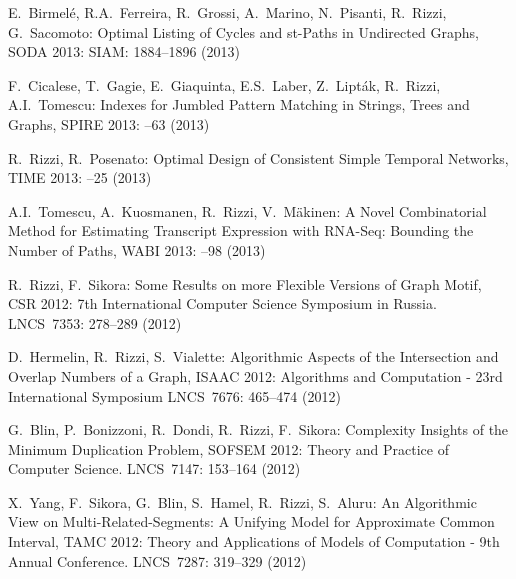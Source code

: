 \begin{etaremune}
  \item {E.~Birmel\'e, R.A.~Ferreira, R.~Grossi, A.~Marino, N.~Pisanti, R.~Rizzi, G.~Sacomoto:}
   \newblock Optimal Listing of Cycles and st-Paths in Undirected Graphs,
   \newblock SODA 2013:
   \newblock SIAM: 1884--1896 (2013)

  \item {F.~Cicalese, T.~Gagie, E.~Giaquinta, E.S.~Laber, Z.~Lipt\'ak, R.~Rizzi, A.I.~Tomescu:}
   \newblock Indexes for Jumbled Pattern Matching in Strings, Trees and Graphs,
   \newblock SPIRE 2013:
   --63 (2013)

  \item {R.~Rizzi, R.~Posenato:}
   \newblock Optimal Design of Consistent Simple Temporal Networks,
   \newblock TIME 2013:
   --25 (2013)

  \item {A.I.~Tomescu, A.~Kuosmanen, R.~Rizzi, V.~M\"akinen:}
   \newblock A Novel Combinatorial Method for Estimating Transcript Expression with RNA-Seq: Bounding the Number of Paths,
   \newblock WABI 2013:
   --98 (2013)

\vspace{-1.8mm}
  \item {R.~Rizzi, F.~Sikora:}
   \newblock Some Results on more Flexible Versions of Graph Motif,
   \newblock CSR 2012: 7th International Computer Science Symposium in Russia.
   \newblock LNCS~7353: 278--289 (2012)

\vspace{-1.8mm}
  \item {D.~Hermelin, R.~Rizzi, S.~Vialette:}
   \newblock Algorithmic Aspects of the Intersection and Overlap Numbers of a Graph,
   \newblock ISAAC 2012: Algorithms and Computation - 23rd International Symposium
   \newblock LNCS~7676: 465--474 (2012)

\vspace{-1.8mm}
  \item {G.~Blin, P.~Bonizzoni, R.~Dondi, R.~Rizzi, F.~Sikora:}
   \newblock Complexity Insights of the Minimum Duplication Problem,
   \newblock SOFSEM 2012: Theory and Practice of Computer Science.
   \newblock LNCS~7147: 153--164 (2012)

\vspace{-1.8mm}
  \item {X.~Yang, F.~Sikora, G.~Blin, S.~Hamel, R.~Rizzi, S.~Aluru:}
   \newblock An Algorithmic View on Multi-Related-Segments: A Unifying Model for Approximate Common Interval,
   \newblock TAMC 2012: Theory and Applications of Models of Computation - 9th Annual Conference.
   \newblock LNCS~7287: 319--329 (2012)


\end{etaremune}
